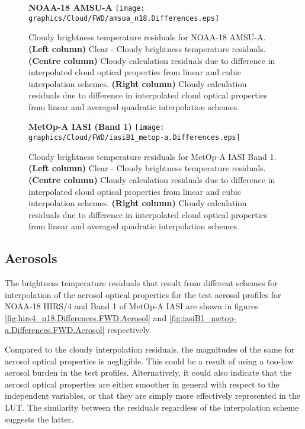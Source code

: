 \begin{figure}[htp]
  \centering
  \textsf{\textbf{NOAA-18 AMSU-A}}\vspace{1.5ex}
  \texttt{[image: graphics/Cloud/FWD/amsua\_n18.Differences.eps]}
  \caption{Cloudy brightness temperature residuals for NOAA-18 AMSU-A. \textbf{(Left column)} Clear - Cloudy brightness temperature residuals. \textbf{(Centre column)} Cloudy calculation residuals due to difference in interpolated cloud optical properties from linear and cubic interpolation schemes. \textbf{(Right column)} Cloudy calculation residuals due to difference in interpolated cloud optical properties from linear and averaged quadratic interpolation schemes.}
  \label{fig:amsua_n18.Differences.FWD.Cloud}
\end{figure}

\begin{figure}[htp]
  \centering
  \textsf{\textbf{MetOp-A IASI (Band 1)}}\vspace{1.5ex}
  \texttt{[image: graphics/Cloud/FWD/iasiB1\_metop-a.Differences.eps]}
  \caption{Cloudy brightness temperature residuals for MetOp-A IASI Band 1. \textbf{(Left column)} Clear - Cloudy brightness temperature residuals. \textbf{(Centre column)} Cloudy calculation residuals due to difference in interpolated cloud optical properties from linear and cubic  interpolation schemes. \textbf{(Right column)} Cloudy calculation residuals due to difference in interpolated cloud optical properties from linear and averaged quadratic interpolation schemes.}
  \label{fig:iasiB1_metop-a.Differences.FWD.Cloud}
\end{figure}

\subsection{Aerosols}
The brightness temperature residuals that result from different schemes for interpolation of the aerosol optical properties for the test aerosol profiles for NOAA-18 HIRS/4 and Band 1 of MetOp-A IASI are shown in figures \ref{fig:hirs4_n18.Differences.FWD.Aerosol} and \ref{fig:iasiB1_metop-a.Differences.FWD.Aerosol} respectively.

Compared to the cloudy interpolation residuals, the magnitudes of the same for aerosol optical properties is negligible. This could be a result of using a too-low aerosol burden in the test profiles. Alternatively, it could also indicate that the aerosol optical properties are either smoother in general with respect to the independent variables, or that they are simply more effectively represented in the LUT. The similarity between the residuals regardless of the interpolation scheme suggests the latter.

